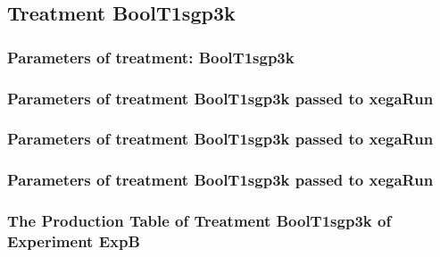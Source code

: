 \documentclass[18pt,c]{beamer}
\makeatletter
\def\beamer@writeslidentry@miniframesoff{%
  \expandafter\beamer@ifempty\expandafter{\beamer@framestartpage}{}%
  {%
   \clearpage\beamer@notesactions%
  }
}
\newcommand*{\miniframesoff}{\let\beamer@writeslidentry=\beamer@writeslidentry@miniframesoff}
\makeatother
\begin{document}
\miniframesoff
\subsection{Treatment BoolT1sgp3k}

 \begin{frame}
 \fontsize{8pt}{9pt}\selectfont
 \frametitle{  Parameters of treatment: BoolT1sgp3k 
 }

 \label{ExpBtParmTable024.tex}  
 \end{frame}


 \begin{frame}
 \fontsize{8pt}{9pt}\selectfont
 \frametitle{  Parameters of treatment BoolT1sgp3k passed to xegaRun
 }

 \label{ExpBtParmTable025.tex}  
 \end{frame}


 \begin{frame}
 \fontsize{8pt}{9pt}\selectfont
 \frametitle{  Parameters of treatment BoolT1sgp3k passed to xegaRun
 }

 \label{ExpBtParmTable026.tex}  
 \end{frame}


 \begin{frame}
 \fontsize{8pt}{9pt}\selectfont
 \frametitle{  Parameters of treatment BoolT1sgp3k passed to xegaRun
 }

 \label{ExpBtParmTable027.tex}  
 \end{frame}

 \begin{frame}
 \fontsize{8pt}{9pt}\selectfont
 \frametitle{ The Production Table of Treatment BoolT1sgp3k of Experiment ExpB }

 \label{ExpBGrammarTable006.tex}  
 \end{frame}
\end{document}
